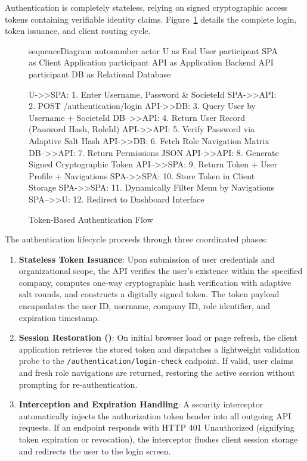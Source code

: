 Authentication is completely stateless, relying on signed cryptographic access tokens containing verifiable identity claims. Figure~\ref{fig:jwt_auth_flow} details the complete login, token issuance, and client routing cycle.

\begin{figure}[H]
  \centering
  \begin{mermaid}[width=0.98\textwidth]
sequenceDiagram
    autonumber
    actor U as End User
    participant SPA as Client Application
    participant API as Application Backend API
    participant DB as Relational Database

    U->>SPA: 1. Enter Username, Password & SocieteId
    SPA->>API: 2. POST /authentication/login
    API->>DB: 3. Query User by Username + SocieteId
    DB-->>API: 4. Return User Record (Password Hash, RoleId)
    API->>API: 5. Verify Password via Adaptive Salt Hash
    API->>DB: 6. Fetch Role Navigation Matrix
    DB-->>API: 7. Return Permissions JSON
    API->>API: 8. Generate Signed Cryptographic Token
    API-->>SPA: 9. Return Token + User Profile + Navigations
    SPA->>SPA: 10. Store Token in Client Storage
    SPA->>SPA: 11. Dynamically Filter Menu by Navigations
    SPA-->>U: 12. Redirect to Dashboard Interface
  \end{mermaid}
  \caption{Token-Based Authentication Flow}
  \label{fig:jwt_auth_flow}
\end{figure}

The authentication lifecycle proceeds through three coordinated phases:
\begin{enumerate}
  \item \textbf{Stateless Token Issuance}: Upon submission of user credentials and organizational scope, the API verifies the user's existence within the specified company, computes one-way cryptographic hash verification with adaptive salt rounds, and constructs a digitally signed token. The token payload encapsulates the user ID, username, company ID, role identifier, and expiration timestamp.
  \item \textbf{Session Restoration ()}: On initial browser load or page refresh, the client application retrieves the stored token and dispatches a lightweight validation probe to the \texttt{/authentication/login-check} endpoint. If valid, user claims and fresh role navigations are returned, restoring the active session without prompting for re-authentication.
  \item \textbf{Interception and Expiration Handling}: A security interceptor automatically injects the authorization token header into all outgoing API requests. If an endpoint responds with HTTP 401 Unauthorized (signifying token expiration or revocation), the interceptor flushes client session storage and redirects the user to the login screen.
\end{enumerate}

